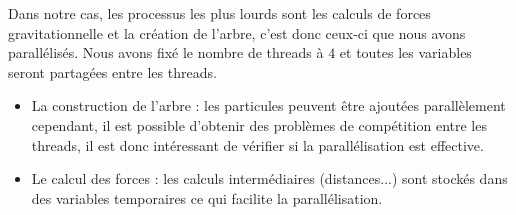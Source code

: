Dans notre cas, les processus les plus lourds sont les calculs de forces gravitationnelle et la création de l'arbre, c'est donc ceux-ci que nous avons parallélisés. Nous avons fixé le nombre de threads à $4$ et toutes les variables seront partagées entre les threads.

\begin{itemize}
\item La construction de l'arbre : les particules peuvent être ajoutées parallèlement cependant, il est possible d'obtenir des problèmes de compétition entre les threads, il est donc intéressant de vérifier si la parallélisation est effective.

\item Le calcul des forces : les calculs intermédiaires (distances...) sont stockés dans des variables temporaires ce qui facilite la parallélisation.
\end{itemize}


